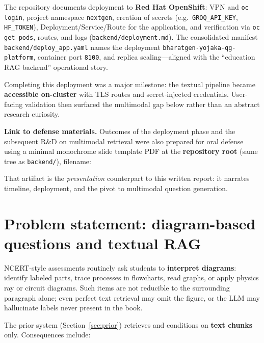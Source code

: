 \documentclass[11pt]{article}
\begin{document}
The repository documents deployment to \textbf{Red Hat OpenShift}: VPN and \texttt{oc login}, project namespace \texttt{nextgen}, creation of secrets (e.g.\ \texttt{GROQ\_API\_KEY}, \texttt{HF\_TOKEN}), Deployment/Service/Route for the application, and verification via \texttt{oc get pods}, routes, and logs (\texttt{backend/deployment.md}). The consolidated manifest \texttt{backend/deploy\_app.yaml} names the deployment \texttt{bharatgen-yojaka-qg-platform}, container port \texttt{8100}, and replica scaling---aligned with the ``education RAG backend'' operational story.

\par
Completing this deployment was a major milestone: the textual pipeline became \textbf{accessible on-cluster} with TLS routes and secret-injected credentials. User-facing validation then surfaced the multimodal gap below rather than an abstract research curiosity.

\par
\textbf{Link to defense materials.} Outcomes of the deployment phase and the subsequent R\&D on multimodal retrieval were also prepared for oral defense using a minimal monochrome slide template PDF at the \textbf{repository root} (same tree as \texttt{backend/}), filename:
\begin{center}
\texttt{}
\end{center}
That artifact is the \emph{presentation} counterpart to this written report: it narrates timeline, deployment, and the pivot to multimodal question generation.

\section{Problem statement: diagram-based questions and textual RAG}
\label{sec:problem}

NCERT-style assessments routinely ask students to \textbf{interpret diagrams}: identify labeled parts, trace processes in flowcharts, read graphs, or apply physics ray or circuit diagrams. Such items are not reducible to the surrounding paragraph alone; even perfect text retrieval may omit the figure, or the LLM may hallucinate labels never present in the book.

\par
The prior system (Section~\ref{sec:prior}) retrieves and conditions on \textbf{text chunks} only. Consequences include:
\end{document}
